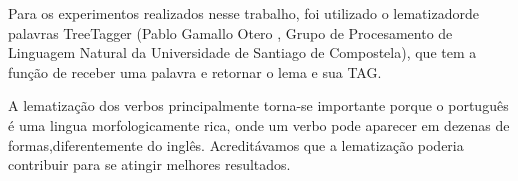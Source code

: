 Para os experimentos realizados nesse trabalho, foi utilizado o lematizadorde palavras TreeTagger (Pablo Gamallo Otero , Grupo de Procesamento de Linguagem Natural da Universidade de Santiago de Compostela), que tem a função de receber uma palavra e retornar o lema e sua TAG.

A lematização dos verbos principalmente torna-se importante porque o português é uma lingua morfologicamente rica, onde um verbo pode aparecer em dezenas de formas,diferentemente do inglês. Acreditávamos que a lematização poderia contribuir para se atingir melhores resultados.




